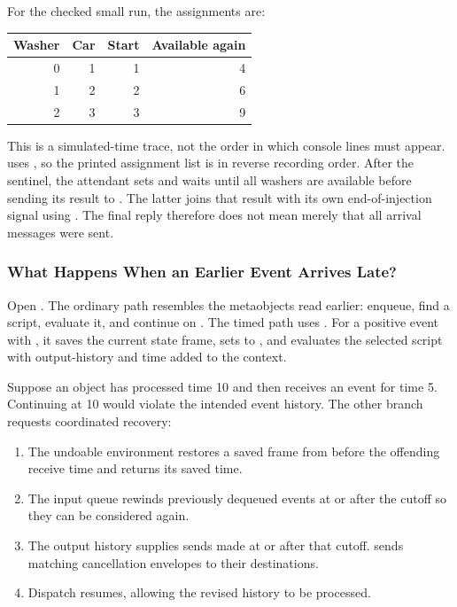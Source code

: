 For the checked small run, the assignments are:

\begin{center}
\begin{tabular}{rrrr}
\textbf{Washer} & \textbf{Car} & \textbf{Start} & \textbf{Available again}\\\hline
0 & 1 & 1 & 4\\
1 & 2 & 2 & 6\\
2 & 3 & 3 & 9\\
\end{tabular}
\end{center}

This is a simulated-time trace, not the order in which console lines
must appear.  uses , so the printed
assignment list is in reverse recording order.
After the sentinel, the attendant sets  and waits
until all washers are available before sending its result to
. The latter joins that result with its own
end-of-injection signal using . The final reply
therefore does not mean merely that all arrival messages were sent.

\subsubsection{What Happens When an Earlier Event Arrives Late?}
\label{sec:tw-recovery}

Open . The ordinary path resembles the
metaobjects read earlier: enqueue, find a script, evaluate it,
and continue on . The timed path uses .
For a positive event with , it saves the current
state frame, sets  to , and evaluates the
selected script with output-history and time added to the context.

Suppose an object has processed time 10 and then receives an event
for time 5. Continuing at 10 would violate the intended event
history. The other branch requests coordinated recovery:


\begin{enumerate}
  \item The undoable environment restores a saved frame from before
        the offending receive time and returns its saved time.
  \item The input queue rewinds previously dequeued events at or after
        the cutoff so they can be considered again.
  \item The output history supplies sends made at or after that
        cutoff.  sends matching cancellation
        envelopes to their destinations.
  \item Dispatch resumes, allowing the revised history to be processed.
\end{enumerate}

